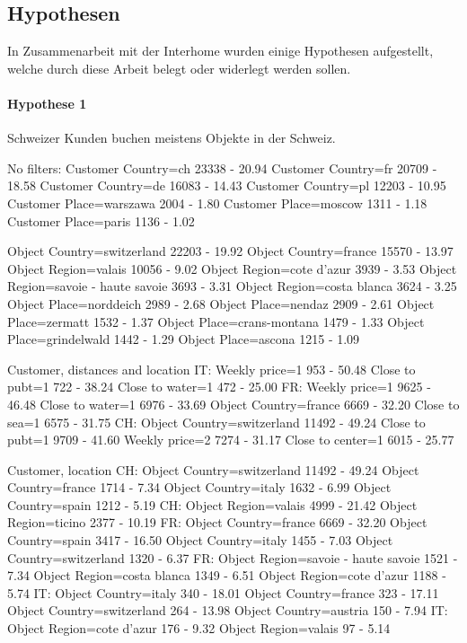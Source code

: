 \subsection{Hypothesen}
In Zusammenarbeit mit der Interhome wurden einige Hypothesen aufgestellt, welche durch diese Arbeit belegt oder widerlegt werden sollen. 


\paragraph{Hypothese 1} Schweizer Kunden buchen meistens Objekte in der Schweiz.

No filters:
	Customer Country=ch						23338 - 20.94
	Customer Country=fr						20709 - 18.58
	Customer Country=de						16083 - 14.43
	Customer Country=pl						12203 - 10.95
	Customer Place=warszawa					2004 - 1.80
	Customer Place=moscow					1311 - 1.18
	Customer Place=paris					1136 - 1.02

	Object Country=switzerland				22203 - 19.92
	Object Country=france					15570 - 13.97
	Object Region=valais					10056 - 9.02
	Object Region=cote d'azur				3939 - 3.53
	Object Region=savoie - haute savoie		3693 - 3.31
	Object Region=costa blanca				3624 - 3.25
	Object Place=norddeich					2989 - 2.68
	Object Place=nendaz						2909 - 2.61
	Object Place=zermatt					1532 - 1.37
	Object Place=crans-montana				1479 - 1.33
	Object Place=grindelwald				1442 - 1.29
	Object Place=ascona						1215 - 1.09

Customer, distances and location
	IT: Weekly price=1 			953 - 50.48 
		Close to pubt=1 		722 - 38.24 
		Close to water=1 		472 - 25.00
	FR: Weekly price=1 			9625 - 46.48
		Close to water=1		6976 - 33.69
		Object Country=france	6669 - 32.20
		Close to sea=1 			6575 - 31.75
	CH: Object Country=switzerland	11492 - 49.24
		Close to pubt=1				9709 - 41.60
		Weekly price=2				7274 - 31.17
		Close to center=1			6015 - 25.77
		
Customer, location
	CH: Object Country=switzerland	11492 - 49.24
		Object Country=france		1714 - 7.34
		Object Country=italy		1632 - 6.99
		Object Country=spain		1212 - 5.19
	CH:	Object Region=valais		4999 - 21.42
		Object Region=ticino		2377 - 10.19
	FR: Object Country=france					6669 - 32.20
		Object Country=spain					3417 - 16.50
		Object Country=italy					1455 - 7.03
		Object Country=switzerland				1320 - 6.37
	FR: Object Region=savoie - haute savoie		1521 - 7.34
		Object Region=costa blanca				1349 - 6.51
		Object Region=cote d'azur				1188 - 5.74
	IT: Object Country=italy			340 - 18.01
		Object Country=france			323 - 17.11
		Object Country=switzerland		264 - 13.98
		Object Country=austria			150 - 7.94
	IT:	Object Region=cote d'azur		176 - 9.32
		Object Region=valais			97 - 5.14
	
